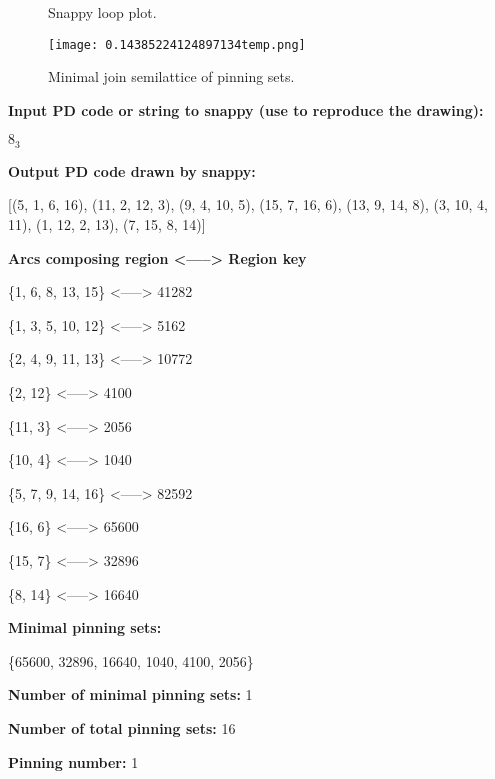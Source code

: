 \documentclass{article}%
\begin{document}
\begin{multicols}{2}
\begin{figure}[H]
\centering

\caption{Snappy loop plot.}
\label{fig:0.11589955967019161temp.svg}
\end{figure}\columnbreak

\begin{figure}[H]
\centering
\texttt{[image: 0.14385224124897134temp.png]}
\caption{Minimal join semilattice of pinning sets.}
\label{fig:0.14385224124897134temp.png}
\end{figure}\end{multicols}\newpage\begin{multicols}{2}
\textbf{Input PD code or string to snappy (use to reproduce the drawing):}

	$8_3$

\textbf{Output PD code drawn by snappy:}

	[(5, 1, 6, 16), (11, 2, 12, 3), (9, 4, 10, 5), (15, 7, 16, 6), (13, 9, 14, 8), (3, 10, 4, 11), (1, 12, 2, 13), (7, 15, 8, 14)]


\textbf{Arcs composing region <-----> Region key}

\{{1, 6, 8, 13, 15}\} <-----> 41282

\{{1, 3, 5, 10, 12}\} <-----> 5162

\{{2, 4, 9, 11, 13}\} <-----> 10772

\{{2, 12}\} <-----> 4100

\{{11, 3}\} <-----> 2056

\{{10, 4}\} <-----> 1040

\{{5, 7, 9, 14, 16}\} <-----> 82592

\{{16, 6}\} <-----> 65600

\{{15, 7}\} <-----> 32896

\{{8, 14}\} <-----> 16640


\columnbreak

\textbf{Minimal pinning sets:}

\{{65600, 32896, 16640, 1040, 4100, 2056}\}



\textbf{Number of minimal pinning sets:} 1

\textbf{Number of total pinning sets:} 16

\textbf{Pinning number:} 1


\end{multicols}
\end{document}
